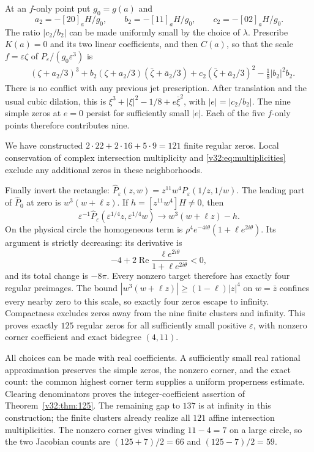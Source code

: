 \documentclass[UTF8,11pt]{ctexart}
\theoremstyle{definition}
\numberwithin{equation}{section}
\DeclareMathOperator{\Rea}{Re}\DeclareMathOperator{\Ima}{Im}
\begin{document}
At an $f$-only point put $g_0=g(a)$ and
\[
 a_2=-[20]_aH/g_0,\qquad
 b_2=-[11]_aH/g_0,\qquad
 c_2=-[02]_aH/g_0.
\]
The ratio $|c_2/b_2|$ can be made uniformly small by the choice
of $\lambda$. Prescribe $K(a)=0$ and its two linear coefficients,
and then $C(a)$, so that the scale $f=\varepsilon\zeta$ of
$P_\varepsilon/(g_0\varepsilon^3)$ is
\begin{align*}
 &(\zeta+a_2/3)^3
 +b_2(\zeta+a_2/3)(\bar\zeta+\bar a_2/3)
 +c_2(\bar\zeta+\bar a_2/3)^2
 -\tfrac18|b_2|^2b_2.
\end{align*}
There is no conflict with any previous jet prescription.
After translation and the usual cubic dilation, this is
$\xi^3+|\xi|^2-1/8+e\bar\xi^2$, with $|e|=|c_2/b_2|$.
The nine simple zeros at $e=0$ persist for sufficiently small
$|e|$. Each of the five $f$-only points therefore contributes nine.

We have constructed $2\cdot22+2\cdot16+5\cdot9=121$ finite
regular zeros. Local conservation of complex intersection
multiplicity and \eqref{v32:eq:multiplicities} exclude any
additional zeros in these neighborhoods.

Finally invert the rectangle:
$\widehat P_\varepsilon(z,w)=z^{11}w^4P_\varepsilon(1/z,1/w)$.
The leading part of $\widehat P_0$ at zero is
$w^3(w+\ell z)$. If $h=[z^{11}w^4]H\ne0$, then
\begin{equation}\label{v32:eq:infinity}
 \varepsilon^{-1}\widehat P_\varepsilon
      (\varepsilon^{1/4}z,\varepsilon^{1/4}w)
 \longrightarrow w^3(w+\ell z)-h.
\end{equation}
On the physical circle the homogeneous term is
$\rho^4e^{-4i\theta}(1+\ell e^{2i\theta})$.
Its argument is strictly decreasing: its derivative is
\[
 -4+2\Rea\frac{\ell e^{2i\theta}}{1+\ell e^{2i\theta}}<0,
\]
and its total change is $-8\pi$. Every nonzero target therefore
has exactly four regular preimages. The bound
$|w^3(w+\ell z)|\ge(1-\ell)|z|^4$ on $w=\bar z$
confines every nearby zero to this scale, so exactly four
zeros escape to infinity. Compactness excludes zeros away
from the nine finite clusters and infinity. This proves exactly
$125$ regular zeros for all sufficiently small positive
$\varepsilon$, with nonzero corner coefficient and exact
bidegree $(4,11)$.

All choices can be made with real coefficients. A sufficiently
small real rational approximation preserves the simple zeros,
the nonzero corner, and the exact count: the common highest
corner term supplies a uniform properness estimate.
Clearing denominators proves the integer-coefficient assertion
of Theorem~\ref{v32:thm:125}. The remaining gap to $137$ is
at infinity in this construction; the finite clusters already
realize all $121$ affine intersection multiplicities.
The nonzero corner gives winding $11-4=7$ on a large circle,
so the two Jacobian counts are $(125+7)/2=66$ and $(125-7)/2=59$.
\end{document}
